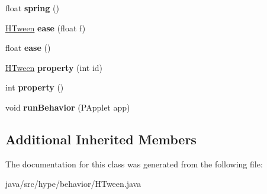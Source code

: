 \begin{DoxyCompactItemize}
\item 
\hypertarget{classhype_1_1behavior_1_1_h_tween_a0ef1eb7d510b05aebfb8f9c008eb0c72}{float {\bfseries spring} ()}\label{classhype_1_1behavior_1_1_h_tween_a0ef1eb7d510b05aebfb8f9c008eb0c72}

\item 
\hypertarget{classhype_1_1behavior_1_1_h_tween_a44ae3b25b5a0e8715c3138c2abbfde46}{\hyperlink{classhype_1_1behavior_1_1_h_tween}{H\-Tween} {\bfseries ease} (float f)}\label{classhype_1_1behavior_1_1_h_tween_a44ae3b25b5a0e8715c3138c2abbfde46}

\item 
\hypertarget{classhype_1_1behavior_1_1_h_tween_a78b86c77cd6979a729081f59ba966f18}{float {\bfseries ease} ()}\label{classhype_1_1behavior_1_1_h_tween_a78b86c77cd6979a729081f59ba966f18}

\item 
\hypertarget{classhype_1_1behavior_1_1_h_tween_a7f0d7cd38ab1ca1650b5ee561a367872}{\hyperlink{classhype_1_1behavior_1_1_h_tween}{H\-Tween} {\bfseries property} (int id)}\label{classhype_1_1behavior_1_1_h_tween_a7f0d7cd38ab1ca1650b5ee561a367872}

\item 
\hypertarget{classhype_1_1behavior_1_1_h_tween_a9ed83d075e0e6f13117f47dc33cbd35f}{int {\bfseries property} ()}\label{classhype_1_1behavior_1_1_h_tween_a9ed83d075e0e6f13117f47dc33cbd35f}

\item 
\hypertarget{classhype_1_1behavior_1_1_h_tween_ac12d69a33663b6c1ece91571cacfbefa}{void {\bfseries run\-Behavior} (P\-Applet app)}\label{classhype_1_1behavior_1_1_h_tween_ac12d69a33663b6c1ece91571cacfbefa}

\end{DoxyCompactItemize}
\subsection*{Additional Inherited Members}


The documentation for this class was generated from the following file\-:\begin{DoxyCompactItemize}
\item 
java/src/hype/behavior/H\-Tween.\-java\end{DoxyCompactItemize}
